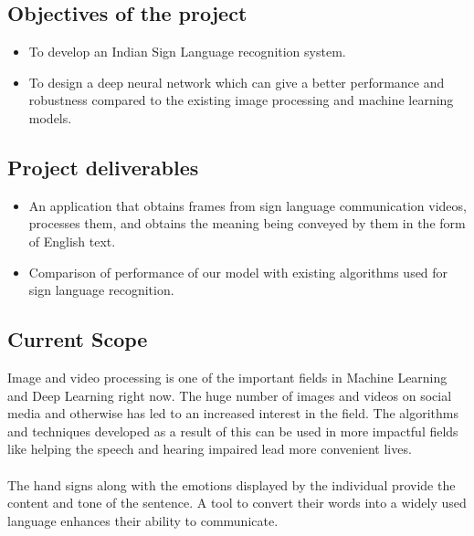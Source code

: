 \documentclass[12pt,oneside,a4paper]{article}
\begin{document}
		\subsection{Objectives of the project}

			\begin{itemize}
				\item To develop an Indian Sign Language recognition system.
				\item To design a deep neural network which can give a better performance and robustness compared to the existing image processing and machine learning models.
			\end{itemize}

		\subsection{Project deliverables}
		
			\begin{itemize}
				\item An application that obtains frames from sign language communication videos, processes them, and obtains the meaning being conveyed by them in the form of English text.
				\item Comparison of performance of our model with existing algorithms used for sign language recognition.
			\end{itemize}

		\subsection{Current Scope}
			    Image and video processing is one of the important fields in Machine Learning and Deep Learning right now. The huge number of images and videos on social media and otherwise has led to an increased interest in the field. The algorithms and techniques developed as a result of this can be used in more impactful fields like helping the speech and hearing impaired lead more convenient lives. \\
			\\
			The hand signs along with the emotions displayed by the individual provide the content and tone of the sentence. A tool to convert their words into a widely used language enhances their ability to communicate.
\end{document}
